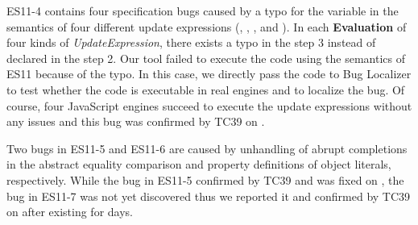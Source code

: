 ES11-4 contains four specification bugs caused by a typo for the variable in the
semantics of four different update expressions (, ,
, and ).  In each \textbf{Evaluation} of four kinds of
\textit{UpdateExpression}, there exists a typo  in the step 3
instead of  declared in the step 2.  Our tool failed to execute
the code  using the semantics of ES11 because of the typo.  In this
case, we directly pass the code to \textsf{Bug Localizer} to test whether the
code is executable in real engines and to localize the bug.  Of course, four
JavaScript engines succeed to execute the update expressions without any issues
and this bug was confirmed by TC39 on \inred{-}.

Two bugs in ES11-5 and ES11-6 are caused by unhandling of abrupt completions in
the abstract equality comparison and property definitions of object literals,
respectively.  While the bug in ES11-5 confirmed by TC39 and was fixed on
\inred{-}, the bug in ES11-7 was not yet discovered thus we reported it and
confirmed by TC39 on \inred{-} after existing for \inred{-} days.
